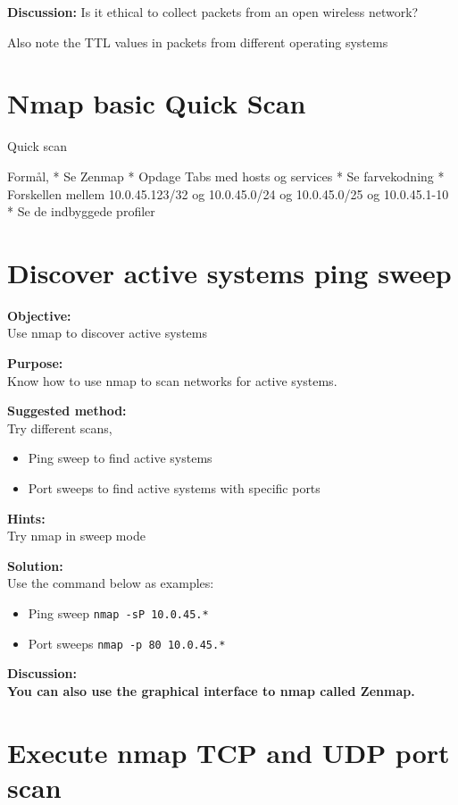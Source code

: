 \documentclass[a4paper,11pt,notitlepage]{report}
\begin{document}
{\bf Discussion:}
Is it ethical to collect packets from an open wireless network?

Also note the TTL values in packets from different operating systems


\chapter{Nmap basic Quick Scan}

Quick scan

Formål,
* Se Zenmap
* Opdage Tabs med hosts og services
* Se farvekodning
* Forskellen mellem 10.0.45.123/32 og 10.0.45.0/24 og 10.0.45.0/25 og 10.0.45.1-10
* Se de indbyggede profiler


\chapter{Discover active systems ping sweep}
\label{ex:nmap-pingsweep}

{\bf Objective:}\\
Use nmap to discover active systems

{\bf Purpose:}\\
Know how to use nmap to scan networks for active systems.

{\bf Suggested method:}\\
Try different scans,
\begin{itemize}
\item Ping sweep to find active systems
\item Port sweeps to find active systems with specific ports
\end{itemize}

{\bf Hints:} \\
Try nmap in sweep mode

{\bf Solution:}\\
Use the command below as examples:
\begin{itemize}
\item Ping sweep \verb+nmap -sP 10.0.45.*+
\item Port sweeps \verb+nmap -p 80 10.0.45.*+
\end{itemize}

{\bf Discussion:}\\

{\bf You can also use the graphical interface to nmap called Zenmap.}


\chapter{Execute nmap TCP and UDP port scan}
\label{ex:nmap-synscan}
\end{document}
